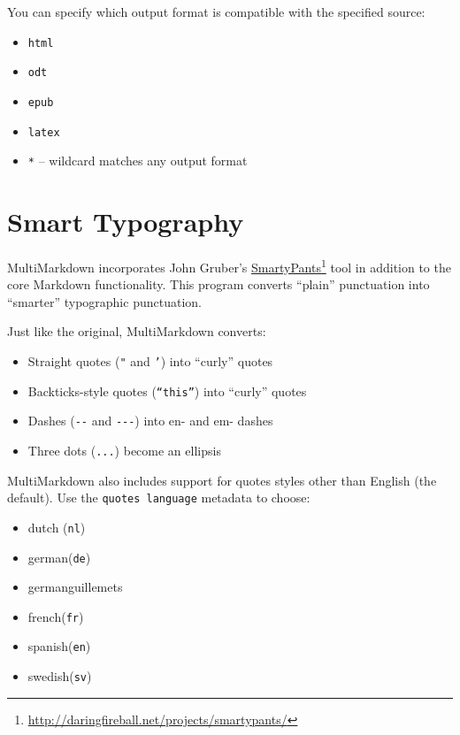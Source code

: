 You can specify which output format is compatible with the specified source:

\begin{itemize}
\item \texttt{html}

\item \texttt{odt}

\item \texttt{epub}

\item \texttt{latex}

\item \texttt{*} -- wildcard matches any output format

\end{itemize}

\section{Smart Typography}
\label{smarttypography}

MultiMarkdown incorporates John Gruber's \href{http://daringfireball.net/projects/smartypants/}{SmartyPants}\footnote{\href{http://daringfireball.net/projects/smartypants/}{http:\slash \slash daringfireball.net\slash projects\slash smartypants\slash }} tool in addition to the core Markdown functionality. This program converts ``plain'' punctuation into ``smarter'' typographic punctuation.

Just like the original, MultiMarkdown converts:

\begin{itemize}
\item Straight quotes (\texttt{"} and \texttt{'}) into ``curly'' quotes

\item Backticks-style quotes (\texttt{``this''}) into ``curly'' quotes

\item Dashes (\texttt{-{}-} and \texttt{-{}-{}-}) into en- and em- dashes

\item Three dots (\texttt{...}) become an ellipsis

\end{itemize}

MultiMarkdown also includes support for quotes styles other than English (the default). Use the \texttt{quotes language} metadata to choose:

\begin{itemize}
\item dutch (\texttt{nl})

\item german(\texttt{de})

\item germanguillemets

\item french(\texttt{fr})

\item spanish(\texttt{en})

\item swedish(\texttt{sv})

\end{itemize}

